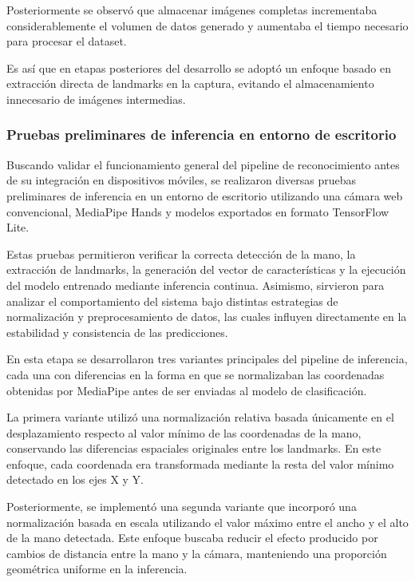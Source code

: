 	Posteriormente se observó que almacenar imágenes completas
	incrementaba considerablemente el volumen de datos generado y aumentaba el tiempo
	necesario para procesar el dataset.
	
	Es así que en etapas posteriores del desarrollo se adoptó un enfoque
	basado en extracción directa de landmarks en la captura, evitando el
	almacenamiento innecesario de imágenes intermedias.
	
	\subsubsection{Pruebas preliminares de inferencia en entorno de escritorio}
	
	Buscando validar el funcionamiento general del pipeline de reconocimiento antes de su integración en dispositivos móviles, se realizaron diversas pruebas preliminares de inferencia en un entorno de escritorio utilizando una cámara web convencional, MediaPipe Hands y modelos exportados en formato TensorFlow Lite.
	
	Estas pruebas permitieron verificar la correcta detección de la mano, la extracción de landmarks, la generación del vector de características y la ejecución del modelo entrenado mediante inferencia continua. Asimismo, sirvieron para analizar el comportamiento del sistema bajo distintas estrategias de normalización y preprocesamiento de datos, las cuales influyen directamente en la estabilidad y consistencia de las predicciones.
	
	En esta etapa se desarrollaron tres variantes principales del pipeline de inferencia, cada una con diferencias en la forma en que se normalizaban las coordenadas obtenidas por MediaPipe antes de ser enviadas al modelo de clasificación.
	
	La primera variante utilizó una normalización relativa basada únicamente en el desplazamiento respecto al valor mínimo de las coordenadas de la mano, conservando las diferencias espaciales originales entre los landmarks. En este enfoque, cada coordenada era transformada mediante la resta del valor mínimo detectado en los ejes X y Y.
	
	Posteriormente, se implementó una segunda variante que incorporó una normalización basada en escala utilizando el valor máximo entre el ancho y el alto de la mano detectada. Este enfoque buscaba reducir el efecto producido por cambios de distancia entre la mano y la cámara, manteniendo una proporción geométrica uniforme en la inferencia.
	
